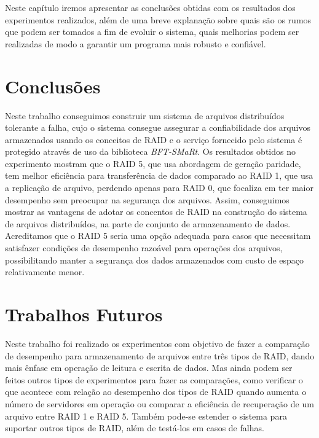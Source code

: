 Neste capítulo iremos apresentar as conclusões obtidas com os resultados dos experimentos realizados, além de uma breve explanação sobre quais são os rumos que podem ser tomados a fim de evoluir o sistema, quais melhorias podem ser realizadas de modo a garantir um programa mais robusto e confiável.
\\

\section{Conclusões}


Neste trabalho conseguimos construir um sistema de arquivos distribuídos tolerante a falha, cujo o sistema consegue assegurar a confiabilidade dos arquivos armazenados usando os conceitos de RAID e o serviço fornecido pelo sistema é protegido através de uso da biblioteca \textit{BFT-SMaRt}.
Os resultados obtidos no experimento mostram que o RAID 5, que usa abordagem de geração paridade, tem melhor eficiência para transferência de dados comparado ao RAID 1, que usa a replicação de arquivo, perdendo apenas para RAID 0, que focaliza em ter maior desempenho sem preocupar na segurança dos arquivos.
Assim, conseguimos mostrar as vantagens de adotar os concentos de RAID na construção do sistema de arquivos distribuídos, na parte de conjunto de armazenamento de dados. Acreditamos que o RAID 5 seria uma opção adequada para casos que necessitam satisfazer condições de desempenho razoável para operações dos arquivos, possibilitando manter a segurança dos dados armazenados com custo de espaço relativamente menor.
\\


\section{Trabalhos Futuros}

Neste trabalho foi realizado os experimentos com objetivo de fazer a comparação de desempenho para armazenamento de arquivos entre três tipos de RAID, dando mais ênfase em operação de leitura e escrita de dados.
Mas ainda podem ser feitos outros tipos de experimentos para fazer as comparações, como verificar o que acontece com relação ao desempenho dos tipos de RAID quando aumenta o número de servidores em operação ou comparar a eficiência de recuperação de um arquivo entre RAID 1 e RAID 5. Também pode-se estender o sistema para suportar outros tipos de RAID, além de testá-los em casos de falhas.
\\

